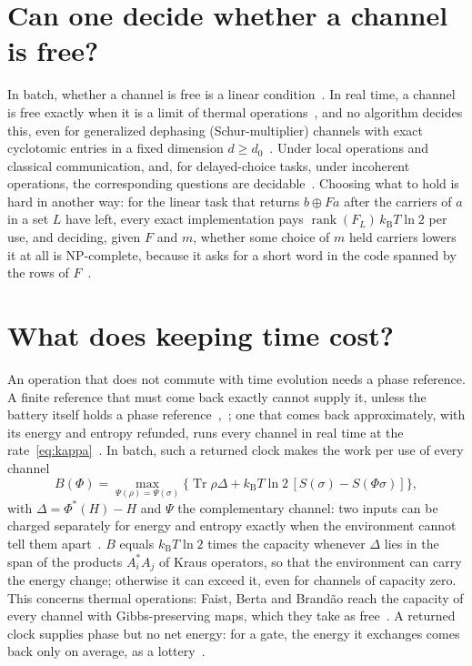\documentclass[11pt]{article}
\newcommand{\Tr}{\operatorname{Tr}}
\newcommand{\kB}{k_{\mathrm B}}
\begin{document}
\section*{Can one decide whether a channel is free?}
In batch, whether a channel is free is a linear condition~\cite[Sec.~6]{Order}. In real time, a channel is free exactly when it is a limit of thermal operations~\cite[Thm.~9]{SaveWork}, and no algorithm decides this, even for generalized dephasing (Schur-multiplier) channels with exact cyclotomic entries in a fixed dimension $d\ge d_0$~\cite[Thm.~13]{SaveWork}. Under local operations and classical communication, and, for delayed-choice tasks, under incoherent operations, the corresponding questions are decidable~\cite[Sec.~6]{Order}. Choosing what to hold is hard in another way: for the linear task that returns $b\oplus Fa$ after the carriers of $a$ in a set $L$ have left, every exact implementation pays $\operatorname{rank}(F_L)\,\kB T\ln2$ per use, and deciding, given $F$ and $m$, whether some choice of $m$ held carriers lowers it at all is NP-complete, because it asks for a short word in the code spanned by the rows of $F$~\cite[Prop.~3]{Order}.

\section*{What does keeping time cost?}
An operation that does not commute with time evolution needs a phase reference. A finite reference that must come back exactly cannot supply it, unless the battery itself holds a phase reference~\cite{MarvianSpekkens19,LostaglioMuller19},~\cite[Thm.~1]{KeepingTime}; one that comes back approximately, with its energy and entropy refunded, runs every channel in real time at the rate~\eqref{eq:kappa}~\cite[Thm.~11]{SaveWork}. In batch, such a returned clock makes the work per use of every channel
\[
B(\Phi)=\max_{\Psi(\rho)=\Psi(\sigma)}\bigl\{\Tr\rho\Delta+\kB T\ln2\,[S(\sigma)-S(\Phi\sigma)]\bigr\},
\]
with $\Delta=\Phi^*(H)-H$ and $\Psi$ the complementary channel: two inputs can be charged separately for energy and entropy exactly when the environment cannot tell them apart~\cite[Thm.~7]{KeepingTime}. $B$ equals $\kB T\ln2$ times the capacity whenever $\Delta$ lies in the span of the products $A_i^*A_j$ of Kraus operators, so that the environment can carry the energy change; otherwise it can exceed it, even for channels of capacity zero. This concerns thermal operations: Faist, Berta and Brand\~ao reach the capacity of every channel with Gibbs-preserving maps, which they take as free~\cite{FBB21}. A returned clock supplies phase but no net energy: for a gate, the energy it exchanges comes back only on average, as a lottery~\cite[Prop.~3]{KeepingTime}.
\end{document}
